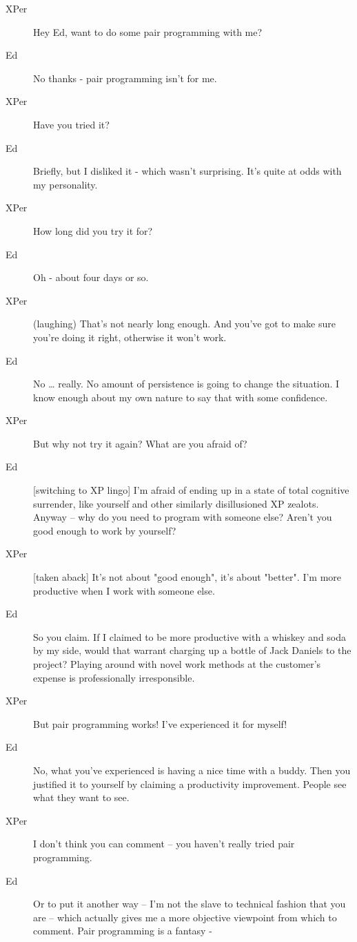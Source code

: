 \documentclass{article}
\begin{document}
\begin{enumerate}
\begin{description}
\item[{XPer}] Hey Ed, want to do some pair programming with me?
\item[{Ed}] No thanks - pair programming isn't for me.
\item[{XPer}] Have you tried it?
\item[{Ed}] Briefly, but I disliked it - which wasn't surprising. It's
quite at odds with my personality.
\item[{XPer}] How long did you try it for?
\item[{Ed}] Oh - about four days or so.
\item[{XPer}] (laughing) That's not nearly long enough. And you've got to
make sure you're doing it right, otherwise it won't work.
\item[{Ed}] No \ldots{} really. No amount of persistence is going to change the
situation. I know enough about my own nature to say that with some
confidence.
\item[{XPer}] But why not try it again? What are you afraid of?
\item[{Ed}] [switching to XP lingo] I'm afraid of ending up in a state of
total cognitive surrender, like yourself and other similarly
disillusioned XP zealots. Anyway -- why do you need to program with
someone else? Aren't you good enough to work by yourself?
\item[{XPer}] [taken aback] It's not about "good enough", it's about
"better". I'm more productive when I work with someone else.
\item[{Ed}] So you claim. If I claimed to be more productive with a whiskey
and soda by my side, would that warrant charging up a bottle of Jack
Daniels to the project? Playing around with novel work methods at the
customer's expense is professionally irresponsible.
\item[{XPer}] But pair programming works! I've experienced it for myself!
\item[{Ed}] No, what you've experienced is having a nice time with a buddy.
Then you justified it to yourself by claiming a productivity
improvement. People see what they want to see.
\item[{XPer}] I don't think you can comment -- you haven't really tried
pair programming.
\item[{Ed}] Or to put it another way -- I'm not the slave to technical
fashion that you are -- which actually gives me a more objective
viewpoint from which to comment. Pair programming is a fantasy -

\end{description}
\end{enumerate}
\end{document}
